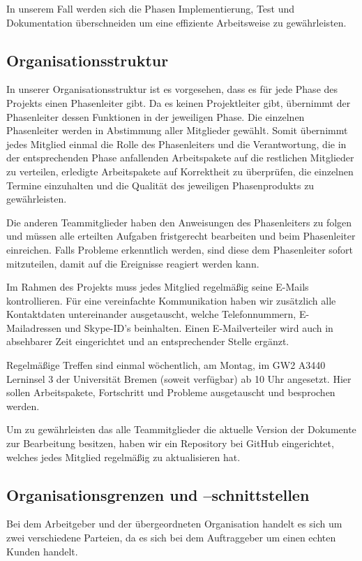 \documentclass[fontsize=12pt,paper=a4,twoside]{scrartcl}
\begin{document}
In unserem Fall werden sich die Phasen Implementierung, Test und Dokumentation überschneiden um eine effiziente Arbeitsweise zu gewährleisten.

\subsection{Organisationsstruktur}
\label{sec:Orga}
In unserer Organisationsstruktur ist es vorgesehen, dass es für jede Phase des Projekts einen Phasenleiter gibt. Da es keinen Projektleiter gibt, übernimmt der Phasenleiter dessen Funktionen in der jeweiligen Phase. Die einzelnen Phasenleiter werden in Abstimmung aller Mitglieder gewählt. Somit übernimmt jedes Mitglied einmal die Rolle des Phasenleiters und die Verantwortung, die in der entsprechenden Phase anfallenden Arbeitspakete auf die restlichen Mitglieder zu verteilen, erledigte Arbeitspakete auf Korrektheit zu überprüfen, die einzelnen Termine einzuhalten und die Qualität des jeweiligen Phasenprodukts zu gewährleisten.

Die anderen Teammitglieder haben den Anweisungen des Phasenleiters zu folgen und müssen alle erteilten Aufgaben fristgerecht bearbeiten und beim Phasenleiter einreichen. Falls Probleme erkenntlich werden, sind diese dem Phasenleiter sofort mitzuteilen, damit auf die Ereignisse reagiert werden kann.

Im Rahmen des Projekts muss jedes Mitglied regelmäßig seine E-Mails kontrollieren. Für eine vereinfachte Kommunikation haben wir zusätzlich alle Kontaktdaten untereinander ausgetauscht, welche Telefonnummern, E-Mailadressen und Skype-ID's beinhalten. Einen E-Mailverteiler wird auch in absehbarer Zeit eingerichtet und an entsprechender Stelle ergänzt.

Regelmäßige Treffen sind einmal wöchentlich, am Montag, im GW2 A3440 Lerninsel 3 der Universität Bremen (soweit verfügbar) ab 10 Uhr angesetzt. Hier sollen Arbeitspakete, Fortschritt und Probleme ausgetauscht und besprochen werden.

Um zu gewährleisten das alle Teammitglieder die aktuelle Version der Dokumente zur Bearbeitung besitzen, haben wir ein Repository bei GitHub eingerichtet, welches jedes Mitglied regelmäßig zu aktualisieren hat.

\subsection{Organisationsgrenzen und --schnittstellen}

Bei dem Arbeitgeber und der übergeordneten Organisation handelt es sich um zwei verschiedene Parteien, da es sich bei dem Auftraggeber um einen echten Kunden handelt.
\end{document}
